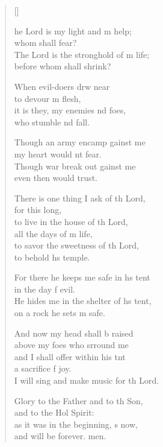 \settowidth{\versewidth}{He hides me in the shelter of his tent, *}
\begin{verse}[\versewidth]
  \begin{patverse}
he Lord is my light and m help;\Med\\
whom shall  fear?\\
The Lord is the stronghold of m life;\Med\\
before whom shall  shrink?

When evil-doers drw near\Med\\
to devour m flesh,\\
it is they, my enemies nd foes,\Med\\
who stumble nd fall.

Though an army encamp gainst me\Med\\
my heart would nt fear.\\
Though war break out gainst me\Med\\
even then would  trust.

There is one thing I ask of th Lord,\Med\\
for this  long,\\
to live in the house of th Lord,\Med\\
all the days of m life,\\
to savor the sweetness of th Lord,\Med\\
to behold h\pointup{\i}s temple.

For there he keeps me safe in h\pointup{\i}s tent\Med\\
in the day f evil.\\
He hides me in the shelter of h\pointup{\i}s tent,\Med\\
on a rock he sets m safe.

And now my head shall b raised\Med\\
above my foes who srround me\\
and I shall offer within his tnt\Flex\\
a sacrifice f joy.\Med\\
I will sing and make music for th Lord.

Glory to the Father and to th Son,\Med\\
and to the Hol Spirit:\\
as it was in the beginning, \pointup{\i}s now,\Med\\
and will be forever. men.
  \end{patverse}
\end{verse}
